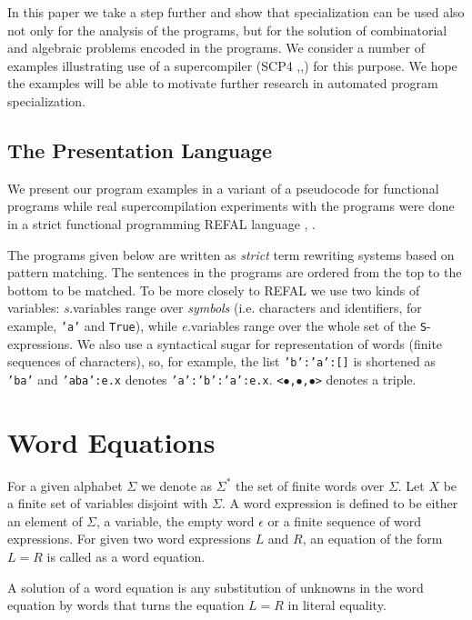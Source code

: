 \documentclass[preprint]{sigplanconf}
\begin{document}
In this paper we take a step further and show that specialization can be used also not only for the analysis of the programs, but  for the solution of combinatorial and algebraic problems encoded in the programs.    We consider a number of examples illustrating use of a supercompiler (SCP4 \cite{N:03},\cite{Nemytykh:SCP4book},\cite{NT:00}) for this purpose.  
We hope the examples will be able 
to motivate further research in automated program specialization. 

\subsection{The Presentation Language}

We present our program examples in a variant of a pseudocode for functional programs 
while real supercompilation experiments with the programs were done in a strict functional programming REFAL language \cite{Turchin:Refal5}, \cite{Refal5:PZ}. 

The programs given below are written as \emph{strict} term rewriting systems based on pattern matching. The sentences in the programs are ordered from the top to the bottom to be matched. 
To be more closely to REFAL 
we use two kinds of variables: \emph{s.}variables range over \emph{symbols} (i.e. characters and identifiers, for example, \texttt{'a'} and \texttt{True}),
while \emph{e.}variables range over the whole set of the \texttt{S}-expressions. 
We also use a syntactical  sugar for representation of words (finite sequences of characters), so,  for example, the list \texttt{'b':'a':[]} is   shortened as \texttt{'ba'} and  \texttt{'aba':e.x} denotes \texttt{'a':'b':'a':e.x}.  
\texttt{<$\bullet$,$\bullet$,$\bullet$>} denotes a triple. 


\section{Word Equations}\label{WordEquations}

For a given alphabet $\Sigma$ we denote as $\Sigma^*$ the set of finite words over $\Sigma$. Let $X$ be a finite set of variables disjoint with $\Sigma$. A word expression is defined to be either an element 
of $\Sigma$, a variable, the empty word $\epsilon$ or a finite sequence of word expressions. For given two word expressions $L$ and $R$, an equation of the form $L = R$ is called as a word equation. 

A solution of a word equation is any substitution of unknowns in the word equation by words that turns the equation $L = R$ 
in literal equality. 
\end{document}
